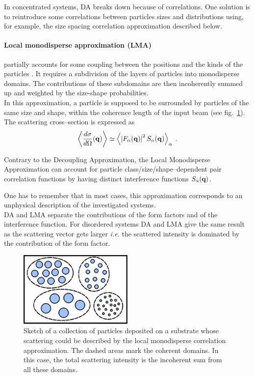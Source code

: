 In concentrated systems, DA breaks down because of correlations. One solution is to reintroduce some correlations between particles sizes and distributions using, for example, the size spacing correlation approximation described below. 

\paragraph{Local monodisperse approximation (LMA)} partially accounts for some coupling between the positions and the kinds of the particles \cite{Pede94}. 
 It requires a subdivision of the layers of particles into monodisperse domains. The contributions of these subdomains are then  incoherently summed up and weighted by the size-shape probabilities.\\ In this approximation, a particle is supposed to be surrounded by particles of the same size and shape, within the coherence length of the input beam (see fig.~\ref{fig:lma}). The scattering cross--section is expressed as
\begin{equation*}
  \left\langle \frac{d\sigma}{d\Omega}(\mathbf{q}) \right\rangle \simeq \left\langle \left\lvert F_\alpha(\mathbf{q})\right\rvert ^2 S_\alpha(\mathbf{q}) \right\rangle_\alpha \; .
\end{equation*}

Contrary to the Decoupling Approximation, the Local Monodisperse Approximation can account for particle class/size/shape--dependent pair correlation functions by having distinct interference functions $S_\alpha(\mathbf{q})$.

One has to remember that in most cases, this approximation corresponds to an unphysical description of the investigated systems. \\ 

DA and LMA separate the contributions of the form factors and of the interference function. For disordered systems DA and LMA give the same result as the scattering vector gets larger \textit{i.e.} the scattered intensity is dominated by the contribution of the form factor.

\begin{figure}[ht]
\begin{center}
\includegraphics[width=0.5\textwidth]{Figures/drawing/drawingLMA.eps}
\end{center}
\caption{Sketch of a collection of particles deposited on a substrate whose scattering could be described by the local monodisperse correlation approximation. The dashed areas mark the coherent domains. In this case, the total scattering intensity is the incoherent sum from all these domains.}
\label{fig:lma}
\end{figure}

